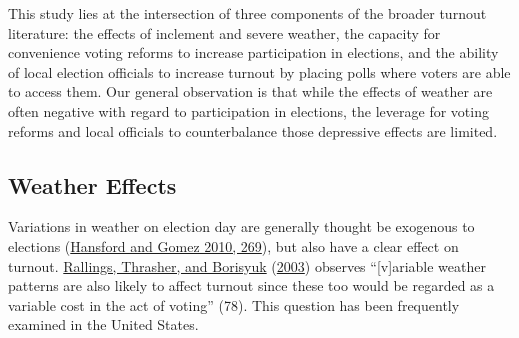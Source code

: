 \documentclass[
  12pt,
]{article}
\begin{document}
This study lies at the intersection of three components of the broader turnout literature: the effects of inclement and severe weather, the capacity for convenience voting reforms to increase participation in elections, and the ability of local election officials to increase turnout by placing polls where voters are able to access them. Our general observation is that while the effects of weather are often negative with regard to participation in elections, the leverage for voting reforms and local officials to counterbalance those depressive effects are limited.

\hypertarget{weather-effects}{%
\subsection*{Weather Effects}\label{weather-effects}}

Variations in weather on election day are generally thought be exogenous to elections (\protect\hyperlink{ref-Hansford2010}{Hansford and Gomez 2010, 269}), but also have a clear effect on turnout. \protect\hyperlink{ref-Rallings2003}{Rallings, Thrasher, and Borisyuk} (\protect\hyperlink{ref-Rallings2003}{2003}) observes ``{[}v{]}ariable weather patterns are also likely to affect turnout since these too would be regarded as a variable cost in the act of voting'' (78). This question has been frequently examined in the United States.
\end{document}
